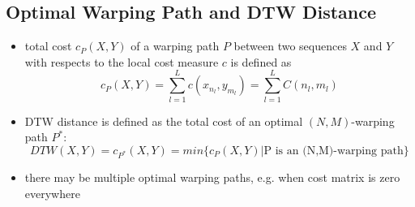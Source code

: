 \documentclass{scrartcl}
\begin{document}
\subsection*{Optimal Warping Path and DTW Distance}
\begin{itemize}
    \item 
        total cost $c_P(X,Y)$ of a warping path $P$ between two sequences $X$ and $Y$ with respects to the local cost measure $c$ is defined as
        $$c_P(X,Y) = \sum_{l=1}^{L}c(x_{n_l}, y_{m_l}) = \sum_{l=1}^{L} C(n_l, m_l)$$
    \item
        DTW distance is defined as the total cost of an optimal $(N,M)$-warping path $P^*$:
        $$DTW(X,Y) = c_{P^*}(X,Y) = min\{c_P(X,Y)|\text{P is an (N,M)-warping path}\}$$
    \item
        there may be multiple optimal warping paths, e.g. when cost matrix is zero everywhere
\end{itemize}
\end{document}
